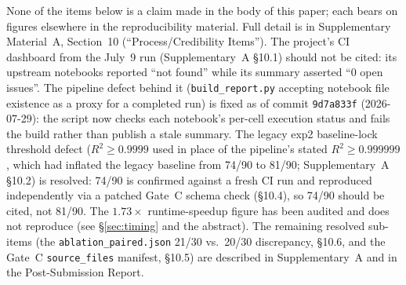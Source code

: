\documentclass[twoside,11pt]{article}
\begin{document}
None of the items below is a claim made in the body of this paper; each bears on figures
elsewhere in the reproducibility material. Full detail is in Supplementary Material~A,
Section~10 (``Process/Credibility Items''). The project's CI dashboard from the July~9 run
(Supplementary~A \S10.1) should not be cited: its upstream notebooks reported ``not found''
while its summary asserted ``0 open issues''. The pipeline defect behind it
(\texttt{build\_report.py} accepting notebook file existence as a proxy for a completed run)
is fixed as of commit \texttt{9d7a833f} (2026-07-29): the script now checks each notebook's
per-cell execution status and fails the build rather than publish a stale summary. The legacy
exp2 baseline-lock threshold defect ($R^2 \geq 0.9999$ used in place of the pipeline's stated
$R^2 \geq 0.999999$, which had inflated the legacy baseline from 74/90 to 81/90;
Supplementary~A \S10.2) is resolved: 74/90 is confirmed against a fresh CI run and reproduced
independently via a patched Gate~C schema check (\S10.4), so 74/90 should be cited, not 81/90.
The $1.73\times$ runtime-speedup figure has been audited and does not reproduce (see
\S\ref{sec:timing} and the abstract). The remaining resolved sub-items (the
\texttt{ablation\_paired.json} 21/30 vs.\ 20/30 discrepancy, \S10.6, and the Gate~C
\texttt{source\_files} manifest, \S10.5) are described in Supplementary~A and in the
Post-Submission Report.
\end{document}
